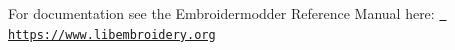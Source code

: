 For documentation see the Embroidermodder Reference Manual here\+: \href{https://www.libembroidery.org}{\texttt{ https\+://www.\+libembroidery.\+org}} 